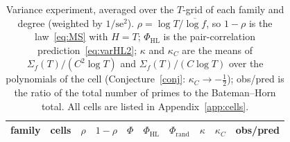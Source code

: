\documentclass[11pt,a4paper]{article}
\theoremstyle{remark}\newtheorem{remark}[theorem]{Remark}
\begin{document}
\begin{table}[htbp]
\centering\footnotesize\setlength{\tabcolsep}{4.5pt}
\caption{Variance experiment, averaged over the $T$-grid of each family and degree (weighted by
$1/\mathrm{se}^2$). $\rho=\log T/\overline{\log f}$, so $1-\rho$ is the law~\eqref{eq:MS} with
$H=T$; $\Phi_{\mathrm{HL}}$ is the pair-correlation prediction~\eqref{eq:varHL2}; $\kappa$ and
$\kappa_C$ are the means of $\Sigma_f(T)/(C^2\log T)$ and $\Sigma_f(T)/(C\log T)$ over the polynomials
of the cell (Conjecture~\ref{conj}: $\kappa_C\to-\tfrac12$); obs/pred is the ratio of the total number
of primes to the Bateman--Horn total. All cells are listed in Appendix~\ref{app:cells}.}\label{tab:summary}
\begin{tabular}{lrrrrrrrrr}
\toprule
family & cells & $\rho$ & $1-\rho$ & $\Phi$ & $\Phi_{\mathrm{HL}}$ & $\Phi_{\mathrm{rand}}$ & $\kappa$ & $\kappa_C$ & obs/pred\\
\midrule

\end{tabular}
\end{table}
\end{document}
